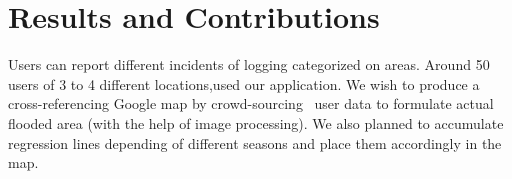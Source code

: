\documentclass{acm_proc_article-sp}
\begin{document}
\section{Results and Contributions}

Users can report different incidents of logging categorized on areas. Around 50 users of 3 to 4 different locations,used our application.  We wish to produce a cross-referencing Google map by crowd-sourcing~\cite{hara2014tohme} user data to formulate actual flooded area (with the help of image processing). We also planned to accumulate regression lines depending of different seasons and place them accordingly in the map.

 






\end{document}
